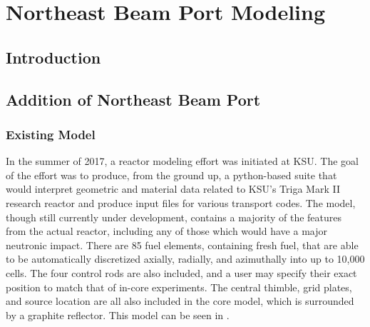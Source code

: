 
\cleardoublepage


\chapter{Northeast Beam Port Modeling}

\section{Introduction}


\section{Addition of Northeast Beam Port}


\subsection{Existing Model}

In the summer of 2017, a reactor modeling effort was initiated at KSU.
The goal of the effort was to produce, from the ground up, a python-based suite that would interpret geometric and material data related to KSU's Triga Mark II research reactor and produce input files for various transport codes.
The model, though still currently under development, contains a majority of the features from the actual reactor, including any of those which would have a major neutronic impact.
There are 85 fuel elements, containing fresh fuel, that are able to be automatically discretized axially, radially, and azimuthally into up to 10,000 cells.
The four control rods are also included, and a user may specify their exact position to match that of in-core experiments.
The central thimble, grid plates, and source location are all also included in the core model, which is surrounded by a graphite reflector.
This model can be seen in .

